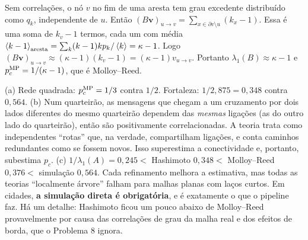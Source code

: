 \documentclass[11pt]{article}
\begin{document}
Sem correlações, o nó $v$ no fim de uma aresta tem grau excedente distribuído como $q_k$, independente de $u$. Então $(B\bm v)_{u\to v} = \sum_{x\in\partial v\setminus u}(k_x-1)$. Essa é uma soma de $k_v-1$ termos, cada um com média $\left\langle k-1 \right\rangle_{\rm aresta} = \sum_k (k-1)kp_k/\left\langle k \right\rangle = \kappa-1$. Logo $(B\bm v)_{u\to v}\approx(\kappa-1)(k_v-1) = (\kappa-1)v_{u\to v}$. Portanto $\lambda_1(B)\approx\kappa-1$ e $p_c^{\rm MP} = 1/(\kappa-1)$, que é Molloy--Reed.

(a) Rede quadrada: $p_c^{\rm MP} = 1/3$ contra $1/2$. Fortaleza: $1/2{,}875 = 0{,}348$ contra $0{,}564$. (b) Num quarteirão, as mensagens que chegam a um cruzamento por dois lados diferentes do mesmo quarteirão dependem das \emph{mesmas} ligações (as do outro lado do quarteirão), então são positivamente correlacionadas. A teoria trata como independentes ``rotas'' que, na verdade, compartilham ligações, e conta caminhos redundantes como se fossem novos. Isso superestima a conectividade e, portanto, subestima $p_c$. (c) $1/\lambda_1(A) = 0{,}245 < $ Hashimoto $0{,}348 <$ Molloy--Reed $0{,}376 <$ simulação $0{,}564$. Cada refinamento melhora a estimativa, mas todas as teorias ``localmente árvore'' falham para malhas planas com laços curtos. Em cidades, \textbf{a simulação direta é obrigatória}, e é exatamente o que o pipeline faz. Há um detalhe: Hashimoto ficou um pouco abaixo de Molloy--Reed provavelmente por causa das correlações de grau da malha real e dos efeitos de borda, que o Problema 8 ignora.
\end{document}

